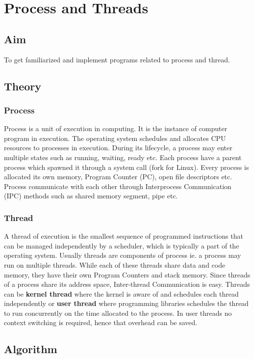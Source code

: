 \section{Process and Threads}
\subsection{Aim}
To get familiarized and implement programs related to process and thread.

\subsection{Theory}
\subsubsection{Process}
Process is a unit of execution in computing. It is the instance of computer program in
execution. The operating system schedules and allocates CPU resources to processes in 
execution. During its lifecycle, a process may enter multiple states such as running,
waiting, ready etc. Each process have a parent process which spawned it through a system
call (fork for Linux). Every process is allocated its own memory, Program Counter (PC), 
open file descriptors etc. Process communicate with each other through Interprocess 
Communication (IPC) methods such as shared memory segment, pipe etc.

\subsubsection{Thread}
A thread of execution is the smallest sequence of programmed instructions that 
can be managed independently by a scheduler, which is typically a part of the 
operating system. Usually threads are components of process ie. a process may run on
multiple threads. While each of these threads share data and code memory, they have their
own Program Counters and stack memory. Since threads of a process share its address space,
Inter-thread Communication is easy. Threads can be \textbf{kernel thread} where the 
kernel is aware of and schedules each thread independently or \textbf{user thread} 
where programming libraries schedules the thread to run concurrently on the time allocated
to the process. In user threads no context switching is required, hence that overhead can
be saved.

\subsection{Algorithm}
